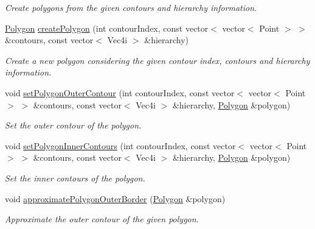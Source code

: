 \begin{DoxyCompactItemize}
\begin{DoxyCompactList}\small\item\em Create polygons from the given contours and hierarchy information. \end{DoxyCompactList}\item 
\hyperlink{namespacemultiscale_1_1analysis_a37bc63d1d786b35968c450508f8bcbd3}{Polygon} \hyperlink{classmultiscale_1_1analysis_1_1RegionDetector_a346d09c6446c421f5029f8acde0e6883}{create\-Polygon} (int contour\-Index, const vector$<$ vector$<$ Point $>$ $>$ \&contours, const vector$<$ Vec4i $>$ \&hierarchy)
\begin{DoxyCompactList}\small\item\em Create a new polygon considering the given contour index, contours and hierarchy information. \end{DoxyCompactList}\item 
void \hyperlink{classmultiscale_1_1analysis_1_1RegionDetector_ae13c72e8eadbadd53ddb02a503e5f63c}{set\-Polygon\-Outer\-Contour} (int contour\-Index, const vector$<$ vector$<$ Point $>$ $>$ \&contours, const vector$<$ Vec4i $>$ \&hierarchy, \hyperlink{namespacemultiscale_1_1analysis_a37bc63d1d786b35968c450508f8bcbd3}{Polygon} \&polygon)
\begin{DoxyCompactList}\small\item\em Set the outer contour of the polygon. \end{DoxyCompactList}\item 
void \hyperlink{classmultiscale_1_1analysis_1_1RegionDetector_a96111b09d4f3998a9856162f21acdd29}{set\-Polygon\-Inner\-Contours} (int contour\-Index, const vector$<$ vector$<$ Point $>$ $>$ \&contours, const vector$<$ Vec4i $>$ \&hierarchy, \hyperlink{namespacemultiscale_1_1analysis_a37bc63d1d786b35968c450508f8bcbd3}{Polygon} \&polygon)
\begin{DoxyCompactList}\small\item\em Set the inner contours of the polygon. \end{DoxyCompactList}\item 
void \hyperlink{classmultiscale_1_1analysis_1_1RegionDetector_a55f526b22492ad31c69d50b93a118306}{approximate\-Polygon\-Outer\-Border} (\hyperlink{namespacemultiscale_1_1analysis_a37bc63d1d786b35968c450508f8bcbd3}{Polygon} \&polygon)
\begin{DoxyCompactList}\small\item\em Approximate the outer contour of the given polygon. \end{DoxyCompactList}\item 

\end{DoxyCompactItemize}
